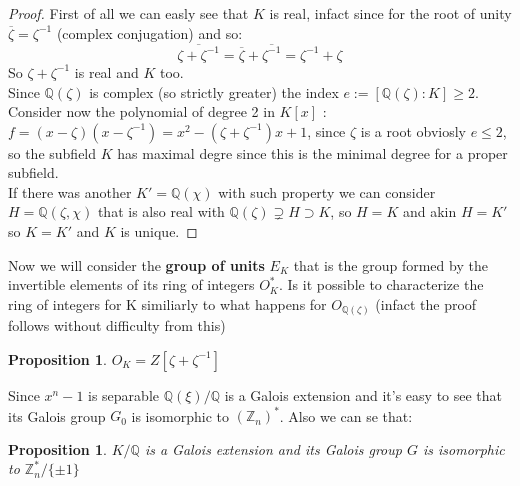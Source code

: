 \documentclass[]{article}
\theoremstyle{plain}
\newtheorem{prop}[teo]{Proposition}
\theoremstyle{remark}
\theoremstyle{definition}
\newcommand{\Z}{\mathbb{Z}}
\newcommand{\Q}{\mathbb{Q}}
\begin{document}
	
	\begin{proof}
		First of all we can easly see that $ K $ is real, infact since for the root of unity $ \overline{\zeta} = \zeta ^{-1} $ (complex conjugation) and so:
		\begin{equation*}
		\overline{ \zeta + \zeta^{-1} }= \overline{ \zeta} + \overline{\zeta^{-1} } = \zeta ^{-1}  + \zeta
		\end{equation*}
		So $ \zeta + \zeta ^{-1} $ is real and $ K $ too.\\
		Since $ \Q (\zeta) $ is complex (so strictly greater) the index $ e := [\Q (\zeta)  : K] \geq 2 $. \\
		Consider now the polynomial of degree 2 in $ K[x] $ : $ f = (x-\zeta)(x- \zeta^{-1}) = x^2 - (\zeta + \zeta ^{-1})x +1  $, since $\zeta$ is a root obviosly $ e \leq 2 $, so the subfield $ K $ has maximal degre since this is the minimal degree for a proper subfield. \\
		If there was another $ K' = \Q ( \chi ) $ with such property we can consider $ H = \Q (\zeta, \chi) $ that is also real with $ \Q (\zeta) \supsetneq H \supset K $, so $ H=K $ and akin $ H = K' $ so $ K = K' $ and $ K $ is unique.
	\end{proof}
	
	Now we will consider the \textbf{group of units} $ E_K$ that is the group formed by the invertible elements of its ring of integers $ O_K^\ast $. Is it possible to characterize the ring of integers for K \cite[Proposition~2.16]{CF} similiarly to what happens for $ O_{\Q (\zeta)} $ (infact the proof follows without difficulty from this)
	
	
	\begin{prop}
		$ O_K = Z[\zeta + \zeta ^{-1}] $
	\end{prop}
	
	
	Since $ x^n - 1 $ is separable $ \Q (\xi)  / \Q $ is a Galois extension and it's easy to see that its Galois group $ G_0  $ is isomorphic to $ ( \Z_{n} )^\ast $. Also we can se that:
	
	\begin{prop}
		$ K / \Q $ is a Galois extension and its Galois group $ G $ is isomorphic to $ \Z_{n}^*/ \{\pm 1\} $
	\end{prop}
	
\end{document}
